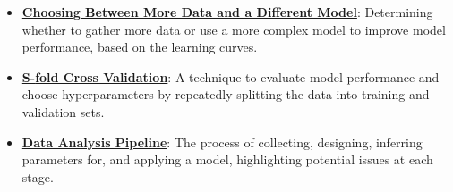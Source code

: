 \documentclass{article}%
\begin{document}
\begin{itemize}[leftmargin=*]
\item \href{https://purdue.brightspace.com/d2l/common/assets/pdfjs-d2l-dist/1.0.14-legacy/web/viewer.html?file=\%2Fcontent\%2Fenforced\%2F1095467-wl.202510.CS.24300.001\%2F10L1-CrossValidation.pdf\%3Fou\%3D1095467\&lang=en-us\&container=d2l-fileviewer-rendered-pdf\&fullscreen=d2l-fileviewer-rendered-pdf-dialog\&height=667#page=21}{\textbf{Choosing Between More Data and a Different Model}}: Determining whether to gather more data or use a more complex model to improve model performance, based on the learning curves.%
\item \href{https://purdue.brightspace.com/d2l/common/assets/pdfjs-d2l-dist/1.0.14-legacy/web/viewer.html?file=\%2Fcontent\%2Fenforced\%2F1095467-wl.202510.CS.24300.001\%2F10L1-CrossValidation.pdf\%3Fou\%3D1095467\&lang=en-us\&container=d2l-fileviewer-rendered-pdf\&fullscreen=d2l-fileviewer-rendered-pdf-dialog\&height=667#page=25}{\textbf{S{-}fold Cross Validation}}: A technique to evaluate model performance and choose hyperparameters by repeatedly splitting the data into training and validation sets.%
\item \href{https://purdue.brightspace.com/d2l/common/assets/pdfjs-d2l-dist/1.0.14-legacy/web/viewer.html?file=\%2Fcontent\%2Fenforced\%2F1095467-wl.202510.CS.24300.001\%2F10L1-CrossValidation.pdf\%3Fou\%3D1095467\&lang=en-us\&container=d2l-fileviewer-rendered-pdf\&fullscreen=d2l-fileviewer-rendered-pdf-dialog\&height=667#page=26}{\textbf{Data Analysis Pipeline}}: The process of collecting, designing, inferring parameters for, and applying a model, highlighting potential issues at each stage.%
\end{itemize}%
\end{document}

